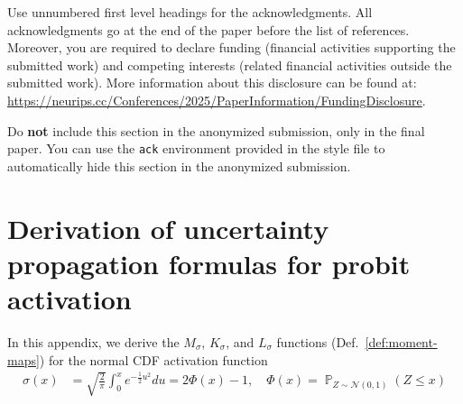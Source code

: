 \documentclass{article}
\DeclareMathOperator{\probability}{\mathbb{P}}
\begin{document}
\begin{ack}
Use unnumbered first level headings for the acknowledgments. All acknowledgments
go at the end of the paper before the list of references. Moreover, you are required to declare
funding (financial activities supporting the submitted work) and competing interests (related financial activities outside the submitted work).
More information about this disclosure can be found at: \url{https://neurips.cc/Conferences/2025/PaperInformation/FundingDisclosure}.


Do {\bf not} include this section in the anonymized submission, only in the final paper. You can use the \texttt{ack} environment provided in the style file to automatically hide this section in the anonymized submission.
\end{ack}






\appendix
\clearpage
\tableofcontents
\clearpage
\section{Derivation of uncertainty propagation formulas for probit activation}
\label{app:probit}
In this appendix, we derive the \(M_\sigma\), \(K_\sigma\), and
\(L_\sigma\) functions (Def.~\ref{def:moment-maps}) for the normal
CDF activation function
\begin{align}
  \sigma(x) &= \sqrt{\frac{2}{\pi}} \int_{0}^x e^{-\frac{1}{2} u^2}
  du = 2 \Phi(x) - 1, \quad \Phi(x) = \probability_{Z \sim \mathcal
  N(0, 1)}(Z \leq x)
  \label{eq:activation}
\end{align}
\end{document}
